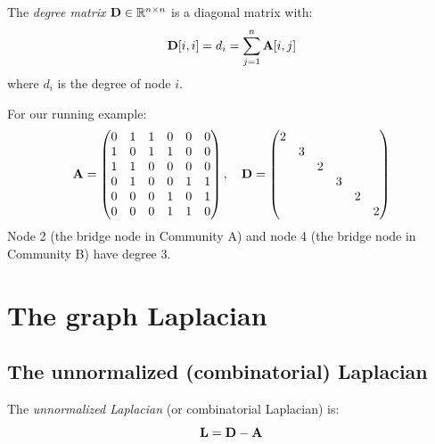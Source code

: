 \begin{notechapter}
\begin{definition}\label{graph-laplacians:def:degree}
The \emph{degree matrix} $\mathbf{D} \in \mathbb{R}^{n \times n}$ is a diagonal matrix with:
\[
\mathbf{D}[i,i] = d_i = \sum_{j=1}^{n} \mathbf{A}[i,j]
\]
where $d_i$ is the degree of node $i$.
\end{definition}

\begin{example}
For our running example:
\[
\mathbf{A} = \begin{pmatrix}
0 & 1 & 1 & 0 & 0 & 0 \\
1 & 0 & 1 & 1 & 0 & 0 \\
1 & 1 & 0 & 0 & 0 & 0 \\
0 & 1 & 0 & 0 & 1 & 1 \\
0 & 0 & 0 & 1 & 0 & 1 \\
0 & 0 & 0 & 1 & 1 & 0
\end{pmatrix}, \quad
\mathbf{D} = \begin{pmatrix}
2 & & & & & \\
& 3 & & & & \\
& & 2 & & & \\
& & & 3 & & \\
& & & & 2 & \\
& & & & & 2
\end{pmatrix}
\]
Node 2 (the bridge node in Community A) and node 4 (the bridge node in Community B) have degree 3.
\end{example}

\section{The graph Laplacian}

\subsection{The unnormalized (combinatorial) Laplacian}

\begin{definition}\label{graph-laplacians:def:unnorm-laplacian}
The \emph{unnormalized Laplacian} (or combinatorial Laplacian) is:
\begin{equation}
\mathbf{L} = \mathbf{D} - \mathbf{A}
\label{graph-laplacians:eq:laplacian}
\end{equation}
\end{definition}


\end{notechapter}
